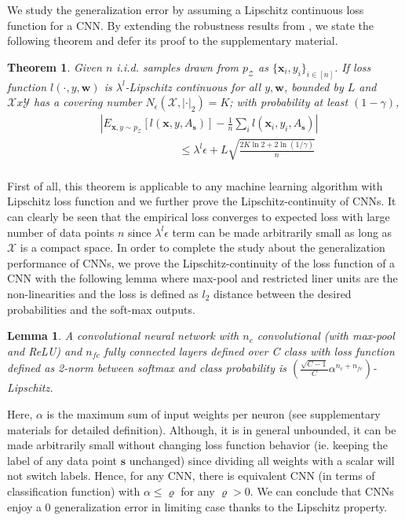 \documentclass{article}
\newtheorem{theorem}{Theorem}
\newtheorem{lemma}{Lemma}
\begin{document}
We study the generalization error by assuming a Lipschitz continuous loss function for a CNN. By extending the robustness results from \cite{robust}, we state the following theorem and defer its proof to the supplementary material.
\begin{theorem}
Given $n$ i.i.d. samples drawn from $p_\mathcal{Z}$ as $\{\mathbf{x}_i,y_i\}_{i\in[n]}$. If loss function $l(\cdot,y,\mathbf{w})$ is $\lambda^l$-Lipschitz continuous for all $y, \mathbf{w}$, bounded by $L$ and $\mathcal{X}x\mathcal{Y}$ has a covering number $N_{\epsilon}(\mathcal{X},|\cdot|_2)=K$; with probability at least $(1-\gamma)$,
\[
\begin{aligned}
&\left|E_{\mathbf{x},y \sim p_\mathcal{Z}}[l(\mathbf{x},y, A_\mathbf{s})] - \frac{1}{n}\sum_i l(\mathbf{x}_i,y_i,A_\mathbf{s})\right| \\
 &\hspace{3cm}\leq  \lambda^l \epsilon + L \sqrt{\frac{2K\ln 2 + 2\ln (1/\gamma)}{n}}\\
\end{aligned}
\]
\label{mainthm}
\end{theorem}

First of all, this theorem is applicable to any machine learning algorithm with Lipschitz loss function and we further prove the Lipschitz-continuity of CNNs. It can clearly be seen that the empirical loss converges to expected loss with large number of data points $n$ since $\lambda^l\epsilon$ term can be made arbitrarily small as long as $\mathcal{X}$ is a compact space. In order to complete the study about the generalization performance of CNNs, we prove the Lipschitz-continuity of the loss function of a CNN with the following lemma where max-pool and restricted liner units are the non-linearities and the loss is defined as $l_2$ distance between the desired probabilities and the soft-max outputs.

\begin{lemma}
A convolutional neural network with $n_c$ convolutional (with max-pool and ReLU) and $n_{fc}$ fully connected layers defined over C class with loss function defined as 2-norm between softmax and class probability is $\left(\frac{\sqrt{C-1}}{C} \alpha^{n_c+n_{fc}}\right)$-Lipschitz.
\end{lemma}

Here, $\alpha$ is the maximum sum of  input weights per neuron (see supplementary materials for detailed definition). Although, it is in general unbounded, it can be made arbitrarily small without changing loss function behavior (ie. keeping the label of any data point $\mathbf{s}$ unchanged) since dividing all weights with a scalar will not switch labels. Hence, for any CNN, there is equivalent CNN (in terms of classification function) with $\alpha \leq \varrho$ for any $\varrho > 0$. We can conclude that CNNs enjoy a $0$ generalization error in limiting case thanks to the Lipschitz property.
\end{document}
